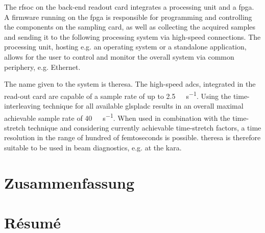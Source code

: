 The \gls{rfsoc} on the back-end readout card integrates a processing unit and a \gls{fpga}. 
A firmware running on the \gls{fpga} is responsible for programming and controlling the components on the sampling card, as well as collecting the acquired samples and sending it to the following processing system via high-speed connections.
The processing unit, hosting e.g. an operating system or a standalone application, allows for the user to control and monitor the overall system via common periphery, e.g. Ethernet.

The name given to the system is \gls{theresa}.
The high-speed \glspl{adc}, integrated in the read-out card are capable of a sample rate of up to \SI{2.5}{\giga \sample \per \second}.
Using the time-interleaving technique for all available glspl{adc} results in an overall maximal achievable sample rate of \SI{40}{\giga \sample \per \second}.  %
When used in combination with the time-stretch technique and considering currently achievable time-stretch factors, a time resolution in the range of hundred of femtoseconds is possible. 
\gls{theresa} is therefore suitable to be used in beam diagnostics, e.g. at the \gls{kara}.

\chapter*{Zusammenfassung}
\chapter*{Résumé}